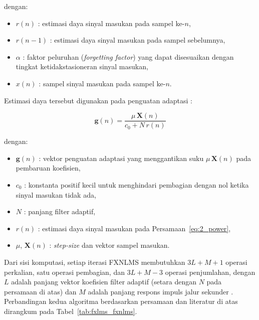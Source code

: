 dengan:
\begin{itemize}[noitemsep, topsep=2pt]
  \item $r(n)$ : estimasi daya sinyal masukan pada sampel ke-$n$,
  \item $r(n-1)$ : estimasi daya sinyal masukan pada sampel sebelumnya,
  \item $\alpha$ : faktor peluruhan (\emph{forgetting factor}) yang dapat disesuaikan dengan tingkat ketidakstasioneran sinyal masukan,
  \item $x(n)$ : sampel sinyal masukan pada sampel ke-$n$.
\end{itemize}

Estimasi daya tersebut digunakan pada penguatan adaptasi \parencite{arezki2017}:

\begin{equation}
  \label{eq:2_gain}
  \mathbf{g}(n) = \frac{\mu\,\mathbf{X}(n)}{c_0 + N\,r(n)}
\end{equation}

dengan:
\begin{itemize}[noitemsep, topsep=2pt]
  \item $\mathbf{g}(n)$ : vektor penguatan adaptasi yang menggantikan suku $\mu\,\mathbf{X}(n)$ pada pembaruan koefisien,
  \item $c_0$ : konstanta positif kecil untuk menghindari pembagian dengan nol ketika sinyal masukan tidak ada,
  \item $N$ : panjang filter adaptif,
  \item $r(n)$ : estimasi daya sinyal masukan pada Persamaan~\eqref{eq:2_power},
  \item $\mu$, $\mathbf{X}(n)$ : \emph{step-size} dan vektor sampel masukan.
\end{itemize}

Dari sisi komputasi, setiap iterasi FXNLMS membutuhkan $3L + M + 1$ operasi perkalian, satu operasi pembagian, dan $3L + M - 3$ operasi penjumlahan, dengan $L$ adalah panjang vektor koefisien filter adaptif (setara dengan $N$ pada persamaan di atas) dan $M$ adalah panjang respons impuls jalur sekunder \parencite{li2026}. Perbandingan kedua algoritma berdasarkan persamaan dan literatur di atas dirangkum pada Tabel~\ref{tab:fxlms_fxnlms}.

